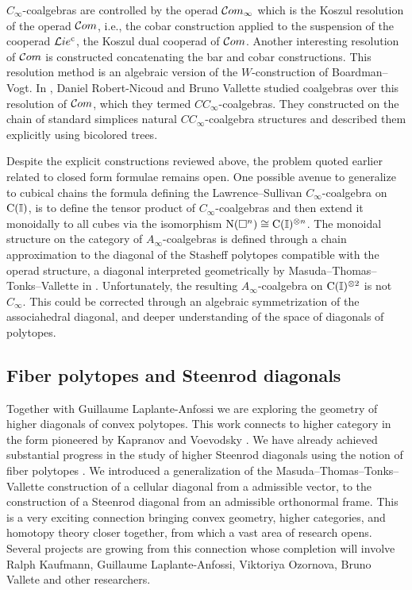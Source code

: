 $C_\infty$-coalgebras are controlled by the operad $\mathcal{C}om_\infty$ which is the Koszul resolution of the operad $\mathcal{C}om$, i.e., the cobar construction applied to the suspension of the cooperad $\mathcal{L}ie^{\mathrm c}$, the Koszul dual cooperad of $\mathcal{C}om$.
Another interesting resolution of $\mathcal{C}om$ is constructed concatenating the bar and cobar constructions.
This resolution method is an algebraic version of the $W$-construction of Boardman--Vogt.
In \cite{vallette2020higherlietheory}, Daniel Robert-Nicoud and Bruno Vallette studied coalgebras over this resolution of $\mathcal{C}om$, which they termed $CC_\infty$-coalgebras.
They constructed on the chain of standard simplices natural $CC_\infty$-coalgebra structures and described them explicitly using bicolored trees.

Despite the explicit constructions reviewed above, the problem quoted earlier related to closed form formulae remains open.
One possible avenue to generalize to cubical chains the formula defining the Lawrence--Sullivan $C_\infty$-coalgebra on $\operatorname{C}(\mathbb{I})$, is to define the tensor product of $C_\infty$-coalgebras and then extend it monoidally to all cubes via the isomorphism $\operatorname{N}(\square^n) \cong \operatorname{C}(\mathbb{I})^{\otimes n}$.
The monoidal structure on the category of $A_\infty$-coalgebras is defined through a chain approximation to the diagonal of the Stasheff polytopes compatible with the operad structure, a diagonal interpreted geometrically by Masuda--Thomas--Tonks--Vallette in \cite{vallette2021associahedra}.
Unfortunately, the resulting $A_\infty$-coalgebra on $\operatorname{C}(\mathbb{I})^{\otimes 2}$ is not $C_\infty$.
This could be corrected through an algebraic symmetrization of the associahedral diagonal, and deeper understanding of the space of diagonals of polytopes.

\subsection{Fiber polytopes and Steenrod diagonals} \label{ss:polytopes}

Together with Guillaume Laplante-Anfossi we are exploring the geometry of higher diagonals of convex polytopes.
This work connects to higher category in the form pioneered by Kapranov and Voevodsky \cite{kapranov1991polycategories}.
We have already achieved substantial progress in the study of higher Steenrod diagonals using the notion of fiber polytopes \cite{billera1992fiber.polytopes}.
We introduced a generalization of the Masuda--Thomas--Tonks--Vallette construction of a cellular diagonal from a admissible vector, to the construction of a Steenrod diagonal from an admissible orthonormal frame.
This is a very exciting connection bringing convex geometry, higher categories, and homotopy theory closer together, from which a vast area of research opens.
Several projects are growing from this connection whose completion will involve Ralph Kaufmann, Guillaume Laplante-Anfossi, Viktoriya Ozornova, Bruno Vallete and other researchers.

